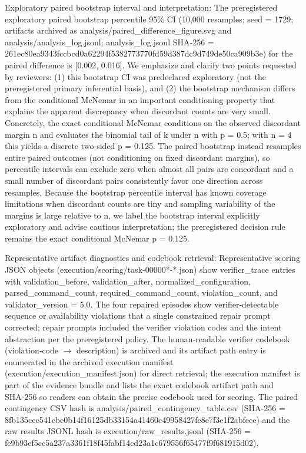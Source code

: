 \documentclass[conference]{IEEEtran}
\begin{document}
Exploratory paired bootstrap interval and interpretation: The preregistered exploratory paired bootstrap percentile 95\% CI (10,000 resamples; seed = 1729; artifacts archived as analysis/paired\_difference\_figure.svg and analysis/analysis\_log.jsonl; analysis\_log.jsonl SHA‑256 = 261ec80e\allowbreak{}a9343fcc\allowbreak{}bcd0a622\allowbreak{}94f53827\allowbreak{}73770fd5\allowbreak{}9d387dc9\allowbreak{}d749de50\allowbreak{}ca909b3e) for the paired difference is [0.002, 0.016]. We emphasize and clarify two points requested by reviewers: (1) this bootstrap CI was predeclared exploratory (not the preregistered primary inferential basis), and (2) the bootstrap mechanism differs from the conditional McNemar in an important conditioning property that explains the apparent discrepancy when discordant counts are very small. Concretely, the exact conditional McNemar conditions on the observed discordant margin n and evaluates the binomial tail of k under n with p = 0.5; with n = 4 this yields a discrete two‑sided p = 0.125. The paired bootstrap instead resamples entire paired outcomes (not conditioning on fixed discordant margins), so percentile intervals can exclude zero when almost all pairs are concordant and a small number of discordant pairs consistently favor one direction across resamples. Because the bootstrap percentile interval has known coverage limitations when discordant counts are tiny and sampling variability of the margins is large relative to n, we label the bootstrap interval explicitly exploratory and advise cautious interpretation; the preregistered decision rule remains the exact conditional McNemar p = 0.125.

Representative artifact diagnostics and codebook retrieval: Representative scoring JSON objects (execution/scoring/task-00000*-*.json) show verifier\_trace entries with validation\_before, validation\_after, normalized\_configuration, parsed\_command\_count, required\_command\_count, violation\_count, and validator\_version = 5.0. The four repaired episodes show verifier‑detectable sequence or availability violations that a single constrained repair prompt corrected; repair prompts included the verifier violation codes and the intent abstraction per the preregistered policy. The human‑readable verifier codebook (violation‑code \ensuremath{\rightarrow} description) is archived and its artifact path entry is enumerated in the archived execution manifest (execution/execution\_manifest.json) for direct retrieval; the execution manifest is part of the evidence bundle and lists the exact codebook artifact path and SHA‑256 so readers can obtain the precise codebook used for scoring. The paired contingency CSV hash is analysis/paired\_contingency\_table.csv (SHA‑256 = 8fb135ce\allowbreak{}c541cbe0\allowbreak{}b14f1612\allowbreak{}5db33154\allowbreak{}a41460c4\allowbreak{}9958427f\allowbreak{}e8e7f3e1\allowbreak{}f2abfece) and the raw results JSONL hash is execution/raw\_results.jsonl (SHA‑256 = fe9b93ef\allowbreak{}5cc5a237\allowbreak{}a3361f18\allowbreak{}f45fabf1\allowbreak{}4cd23a1c\allowbreak{}679556f6\allowbreak{}5477f9f6\allowbreak{}81915d02).
\end{document}
